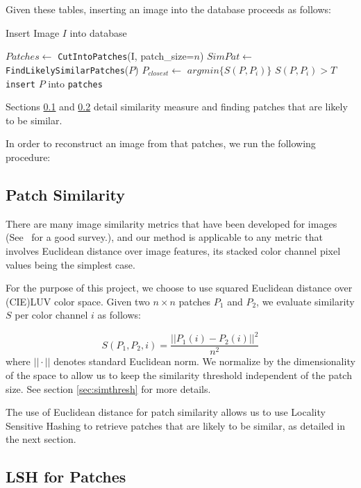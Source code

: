 Given these tables, inserting an image into the database proceeds as follows:

\begin{algorithm}
    \caption{Insert Image $I$ into database}
    \label{alg:insert}
\begin{algorithmic}[1]
\State $Patches \leftarrow $ \texttt{CutIntoPatches}(I, patch\_size=$n$)
\State $SimPat \leftarrow $\texttt{FindLikelySimilarPatches}($P$)
\State $P_{closest} \leftarrow $ $argmin \{ S(P, P_i) \}$
\If $S(P, P_i) > T$
\State \texttt{insert} $P$ into \texttt{patches}
\EndIf
\EndFor
\vspace{3mm}
\end{algorithmic}
\end{algorithm}
Sections \ref{ssec:sim} and \ref{ssec:lsh} detail similarity measure and
finding patches that are likely to be similar.

In order to reconstruct an image from that patches, we run the following
procedure:



\subsection{Patch Similarity}\label{ssec:sim}
There are many image similarity metrics that have been developed for
images (See~\cite{yasmin2013use} for a good survey.), and
our method is applicable to any metric that involves Euclidean
distance over image features, its stacked color channel pixel values
being the simplest case.

For the purpose of this project, we choose to use squared Euclidean
distance over (CIE)LUV color space.
Given two $n \times n$ patches $P_1$ and $P_2$, we evaluate similarity $S$
per color channel $i$ as follows:

\begin{displaymath}
S(P_1, P_2, i) = \frac{||P_1(i) - P_2(i)||^2}{n^2}
\end{displaymath}
where $||\cdot||$ denotes standard Euclidean norm.
We normalize by the dimensionality of the space to allow us to keep the
similarity threshold independent of the patch size. See section \ref{sec:simthresh} for more details.

The use of Euclidean distance for patch similarity
allows us to use Locality Sensitive Hashing to retrieve patches
that are likely to be similar, as detailed in the
next section.

\subsection{LSH for Patches}\label{ssec:lsh}

